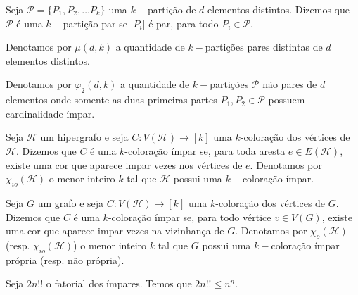  
 
\begin{defi}
	\label{defi1}
	Seja $\mathcal{P} = \{P_1, P_2, \ldots P_k \}$ uma $k-$partição de $d$ elementos distintos. Dizemos que $\mathcal{P}$ é uma $k-$partição par se $|P_i|$ é par, para todo $P_i \in \mathcal{P}$.
\end{defi} \newbegin
 

\begin{defi}
	\label{defi2}
	Denotamos por $\mu(d, k)$ a quantidade de $k-$partições pares distintas de $d$ elementos distintos.
\end{defi} \newbegin

\begin{defi}
	\label{def3}
	Denotamos por $\varphi_2(d, k)$ a quantidade de $k-$partições $\mathcal{P}$ não pares de $d$ elementos onde somente as duas primeiras partes $P_1, P_2 \in \mathcal{P}$ possuem cardinalidade ímpar. 
\end{defi} \newbegin

\begin{defi}
	\label{def4}
	Seja $\mathcal{H}$ um hipergrafo e seja $C : V(\mathcal{H}) \rightarrow [k]$ uma $k$-coloração dos vértices de $\mathcal{H}$. Dizemos que $C$ é uma $k$-coloração ímpar se, para toda aresta $e \in E(\mathcal{H})$, existe uma cor que aparece impar vezes nos vértices de $e$. Denotamos por $\chi_{io}(\mathcal{H})$ o menor inteiro $k$ tal que  $\mathcal{H}$ possui uma $k-$coloração ímpar.
	
\end{defi} \newbegin

\begin{defi}
	\label{def5}
	Seja $G$ um grafo e seja $C : V(\mathcal{H}) \rightarrow [k]$ uma $k$-coloração dos vértices de $G$. Dizemos que $C$ é uma $k$-coloração ímpar se, para todo vértice $v \in V(G)$, existe uma cor que aparece impar vezes na vizinhança de $G$. Denotamos por $\chi_{o}(\mathcal{H})$ (resp. $\chi_{io}(\mathcal{H})$) o menor inteiro $k$ tal que $G$ possui uma $k-$coloração ímpar própria (resp. não própria).
\end{defi} \newbegin


\begin{prop}
	\label{prop1}
	Seja $2n!!$ o fatorial dos ímpares. Temos que $2n!! \leq n^n$.
\end{prop} 
 